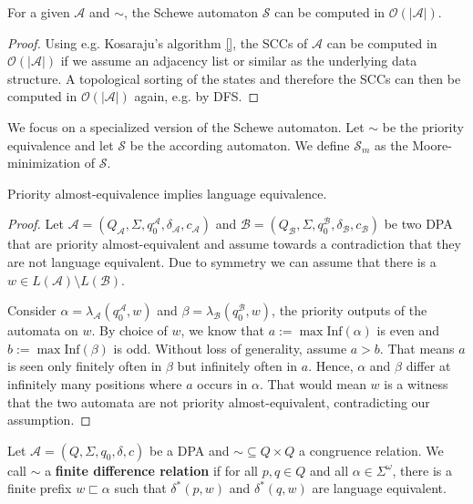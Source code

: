 \begin{lem}
	For a given $\mathcal{A}$ and $\sim$, the Schewe automaton $\mathcal{S}$ can be computed in $\mathcal{O}(|\mathcal{A}|)$.
\end{lem}

\begin{proof}
	Using e.g. Kosaraju's algorithm \ref{}, the SCCs of $\mathcal{A}$ can be computed in $\mathcal{O}(|\mathcal{A}|)$ if we assume an adjacency list or similar as the underlying data structure. A topological sorting of the states and therefore the SCCs can then be computed in $\mathcal{O}(|\mathcal{A}|)$ again, e.g. by DFS.
\end{proof}

We focus on a specialized version of the Schewe automaton. Let $\sim$ be the priority equivalence and let $\mathcal{S}$ be the according automaton. We define $\mathcal{S}_m$ as the Moore-minimization of $\mathcal{S}$.

\begin{lem}
	Priority almost-equivalence implies language equivalence.
\end{lem}

\begin{proof}
	Let $\mathcal{A} = (Q_\mathcal{A}, \Sigma, q_0^\mathcal{A}, \delta_\mathcal{A}, c_\mathcal{A})$ and $\mathcal{B} = (Q_\mathcal{B}, \Sigma, q_0^\mathcal{B}, \delta_\mathcal{B}, c_\mathcal{B})$ be two DPA that are priority almost-equivalent and assume towards a contradiction that they are not language equivalent. Due to symmetry we can assume that there is a $w \in L(\mathcal{A}) \setminus L(\mathcal{B})$. 
	
	Consider $\alpha = \lambda_\mathcal{A}(q_0^\mathcal{A}, w)$ and $\beta = \lambda_\mathcal{B}(q_0^\mathcal{B}, w)$, the priority outputs of the automata on $w$. By choice of $w$, we know that $a := \max \text{Inf}(\alpha)$ is even and $b := \max \text{Inf}(\beta)$ is odd. Without loss of generality, assume $a > b$. That means $a$ is seen only finitely often in $\beta$ but infinitely often in $a$. Hence, $\alpha$ and $\beta$ differ at infinitely many positions where $a$ occurs in $\alpha$. That would mean $w$ is a witness that the two automata are not priority almost-equivalent, contradicting our assumption.
\end{proof}


\begin{defn}
	Let $\mathcal{A} = (Q, \Sigma, q_0, \delta, c)$ be a DPA and $\sim \subseteq Q \times Q$ a congruence relation. We call $\sim$ a \textbf{finite difference relation} if for all $p, q \in Q$ and all $\alpha \in \Sigma^\omega$, there is a finite prefix $w \sqsubset \alpha$ such that $\delta^*(p, w)$ and $\delta^*(q, w)$ are language equivalent.
\end{defn}

